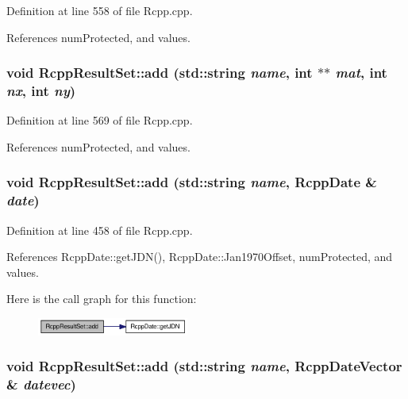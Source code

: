 Definition at line 558 of file Rcpp.cpp.

References numProtected, and values.\hypertarget{classRcppResultSet_2cca9ea4e9554c4fad9bc326355c354c}{
\subsubsection[add]{\setlength{\rightskip}{0pt plus 5cm}void RcppResultSet::add (std::string {\em name}, \/  int $\ast$$\ast$ {\em mat}, \/  int {\em nx}, \/  int {\em ny})}}
\label{classRcppResultSet_2cca9ea4e9554c4fad9bc326355c354c}




Definition at line 569 of file Rcpp.cpp.

References numProtected, and values.\hypertarget{classRcppResultSet_e5cb861a0d6e95cc7ed465ccae2ac4a7}{
\subsubsection[add]{\setlength{\rightskip}{0pt plus 5cm}void RcppResultSet::add (std::string {\em name}, \/  {\bf RcppDate} \& {\em date})}}
\label{classRcppResultSet_e5cb861a0d6e95cc7ed465ccae2ac4a7}




Definition at line 458 of file Rcpp.cpp.

References RcppDate::getJDN(), RcppDate::Jan1970Offset, numProtected, and values.

Here is the call graph for this function:\nopagebreak
\begin{figure}[H]
\begin{center}
\leavevmode
\includegraphics[width=141pt]{classRcppResultSet_e5cb861a0d6e95cc7ed465ccae2ac4a7_cgraph}
\end{center}
\end{figure}
\hypertarget{classRcppResultSet_d7efd746596959ce68ca98c690a2f645}{
\subsubsection[add]{\setlength{\rightskip}{0pt plus 5cm}void RcppResultSet::add (std::string {\em name}, \/  {\bf RcppDateVector} \& {\em datevec})}}
\label{classRcppResultSet_d7efd746596959ce68ca98c690a2f645}





